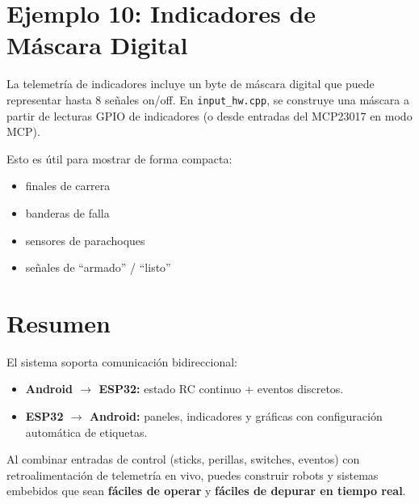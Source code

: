 \section{Ejemplo 10: Indicadores de Máscara Digital}
\label{sec:example-digital-mask}

La telemetría de indicadores incluye un byte de máscara digital que puede representar hasta 8 señales on/off.
En \texttt{input\_hw.cpp}, se construye una máscara a partir de lecturas GPIO de indicadores (o desde entradas del MCP23017 en modo MCP).

Esto es útil para mostrar de forma compacta:
\begin{itemize}
    \item finales de carrera
    \item banderas de falla
    \item sensores de parachoques
    \item señales de ``armado'' / ``listo''
\end{itemize}

\section{Resumen}
\label{sec:practical-summary}

El sistema soporta comunicación bidireccional:

\begin{itemize}
    \item \textbf{Android \(\rightarrow\) ESP32:} estado RC continuo + eventos discretos.
    \item \textbf{ESP32 \(\rightarrow\) Android:} paneles, indicadores y gráficas con configuración automática de etiquetas.
\end{itemize}

Al combinar entradas de control (sticks, perillas, switches, eventos) con retroalimentación de telemetría en vivo, puedes construir
robots y sistemas embebidos que sean \textbf{fáciles de operar} y \textbf{fáciles de depurar en tiempo real}.